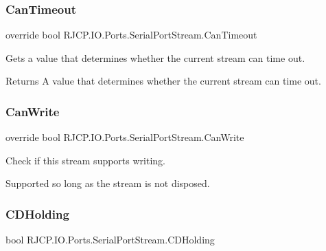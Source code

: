 \subsubsection{\texorpdfstring{CanTimeout}{CanTimeout}}
{\footnotesize\ttfamily override bool R\+J\+C\+P.\+I\+O.\+Ports.\+Serial\+Port\+Stream.\+Can\+Timeout\hspace{0.3cm}{\ttfamily [get]}}



Gets a value that determines whether the current stream can time out. 

\begin{DoxyReturn}{Returns}
A value that determines whether the current stream can time out.
\end{DoxyReturn}
\mbox{\label{class_r_j_c_p_1_1_i_o_1_1_ports_1_1_serial_port_stream_a58ce5a6609d89918d7e383d5a841565a}} 
\subsubsection{\texorpdfstring{CanWrite}{CanWrite}}
{\footnotesize\ttfamily override bool R\+J\+C\+P.\+I\+O.\+Ports.\+Serial\+Port\+Stream.\+Can\+Write\hspace{0.3cm}{\ttfamily [get]}}



Check if this stream supports writing. 

Supported so long as the stream is not disposed. \mbox{\label{class_r_j_c_p_1_1_i_o_1_1_ports_1_1_serial_port_stream_abc3f7b36bc4b10acfaea65d03356fc61}} 
\subsubsection{\texorpdfstring{CDHolding}{CDHolding}}
{\footnotesize\ttfamily bool R\+J\+C\+P.\+I\+O.\+Ports.\+Serial\+Port\+Stream.\+C\+D\+Holding\hspace{0.3cm}{\ttfamily [get]}}



